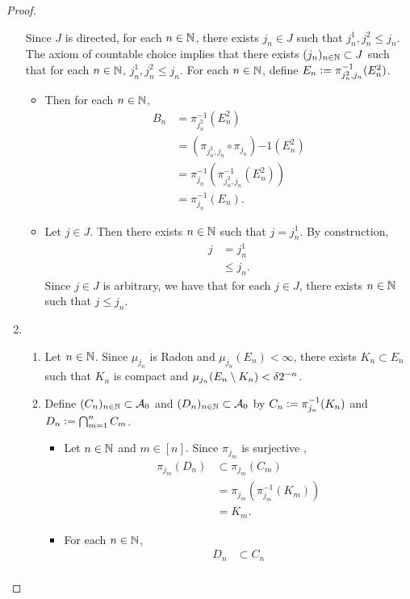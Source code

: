 \documentclass{book}
\begin{document}
\begin{proof}
\begin{enumerate}
		Since $J$ is directed, for each $n \in \mathbb{N}$, there exists $j_n \in J$ such that $j^1_n, j^2_n \leq j_n$. The axiom of countable choice implies that there exists $(j_n)_{n \in \mathbb{N}} \subset J$ such that for each $n \in \mathbb{N}$, $j^1_n, j^2_n \leq j_n$. For each $n \in \mathbb{N}$, define $E_n \vcentcolon= \pi_{j^2_n, j_n}^{-1}(E^2_n)$. 
		\begin{itemize}
			\item Then for each $n \in \mathbb{N}$, 
			\begin{align*}
				B_n
				& = \pi_{j^2_n}^{-1}(E^2_n) \\
				& = (\pi_{j^2_n, j_n} \circ \pi_{j_n}){-1}(E^2_n) \\
				& = \pi_{j_n}^{-1}(\pi_{j^2_n, j_n}^{-1}(E^2_n)) \\
				& = \pi_{j_n}^{-1}(E_n).
			\end{align*}
			\item Let $j \in J$. Then there exists $n \in \mathbb{N}$ such that $j = j^1_n$. By construction, 
			\begin{align*}
				j
				& = j^1_n \\
				& \leq j_n.
			\end{align*}
			Since $j \in J$ is arbitrary, we have that for each $j \in J$, there exists $n \in \mathbb{N}$ such that $j \leq j_n$. 
		\end{itemize}
		\item
		\begin{enumerate}
			\item Let $n \in \mathbb{N}$. Since $\mu_{j_n}$ is Radon and $\mu_{j_n}(E_n) < \infty$, there exists $K_n \subset E_n$ such that $K_n$ is compact and $\mu_{j_n}(E_n \setminus K_n) < \delta2^{-n}$.
			\item Define $(C_n)_{n \in \mathbb{N}} \subset \mathcal{A}_0$ and $(D_n)_{n \in \mathbb{N}} \subset \mathcal{A}_0$ by $C_n \vcentcolon= \pi_{j_n}^{-1}(K_n)$ and $D_n \vcentcolon= \bigcap_{m=1}^n C_m$. 
			\begin{itemize}
				\item Let $n \in \mathbb{N}$ and $m \in [n]$. Since $\pi_{j_m}$ is surjective , 
				\begin{align*}
					\pi_{j_m}(D_n)
					& \subset \pi_{j_m}(C_m) \\
					& = \pi_{j_m}(\pi_{j_m}^{-1}(K_m)) \\
					& = K_m. 
				\end{align*}
				\item For each $n \in \mathbb{N}$, 
				\begin{align*}
					D_n 
					& \subset C_n \\

\end{align*}
\end{itemize}
\end{enumerate}
\end{enumerate}
\end{proof}
\end{document}
